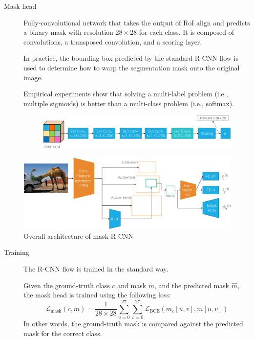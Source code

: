 \begin{description}
\begin{description}
            \item[Mask head] 
                Fully-convolutional network that takes the output of RoI align and predicts a binary mask with resolution $28 \times 28$ for each class. It is composed of convolutions, a transposed convolution, and a scoring layer.

                In practice, the bounding box predicted by the standard R-CNN flow is used to determine how to warp the segmentation mask onto the original image.

                \begin{remark}
                    Empirical experiments show that solving a multi-label problem (i.e., multiple sigmoids) is better than a multi-class problem (i.e., softmax).
                \end{remark}

                \begin{figure}[H]
                    \centering
                    \includegraphics[width=0.85\linewidth]{./img/_mask_rcnn_head.pdf}
                \end{figure}
        \end{description}

        \begin{figure}[H]
            \centering
            \includegraphics[width=0.85\linewidth]{./img/_mask_rcnn.pdf}
            \caption{Overall architecture of mask R-CNN}
        \end{figure}

        \begin{description}
        \item[Training]
            The R-CNN flow is trained in the standard way. 

            Given the ground-truth class $c$ and mask $m$, and the predicted mask $\hat{m}$, the mask head is trained using the following loss:
            \[ \mathcal{L}_\text{mask}(c, m) = \frac{1}{28 \times 28} \sum_{u=0}^{27} \sum_{v=0}^{27} \mathcal{L}_\text{BCE}\left( \hat{m}_{c}[u, v], m[u, v] \right) \]
            In other words, the ground-truth mask is compared against the predicted mask for the correct class.


\end{description}
\end{description}
